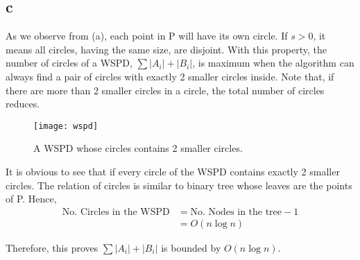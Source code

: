 \subsection*{c}
As we observe from (a), each point in P will have its own circle.
If $s > 0$, it means all circles, having the same size, are disjoint. With this property,
the number of circles of a WSPD, $\sum{|A_i|+|B_i|}$, is maximum when the algorithm
can always find a pair of circles with exactly 2 smaller circles inside.
Note that, if there are more than 2 smaller circles in a circle, the total number of circles reduces. \\

\begin{center}
    \label{figure1}
    \begin{figure}[h]
    \centering
    \texttt{[image: wspd]}\\
    \caption{A WSPD whose circles contains 2 smaller circles.} \label{fig:wspd}
    \end{figure}
\end{center}

It is obvious to see that if every circle of the WSPD  contains exactly 2 smaller circles.
The relation of circles is similar to binary tree whose leaves are the points of P. Hence, \\

\begin{align*}
    \text{No. Circles in the WSPD} &= \text{No. Nodes in the tree} - 1 \\
    &= O(n\log{n})
\end{align*}

Therefore, this proves $\sum{|A_i|+|B_i|}$ is bounded by $O(n\log{n})$.
